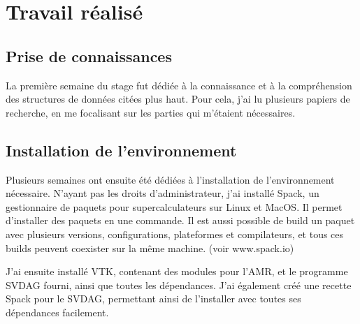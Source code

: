 \documentclass[12pt,a4paper,twoside]{article}
\begin{document}
    \begin{figure}[H]
    \end{figure}

    \begin{figure}[H]
    \end{figure}

    \section{Travail réalisé}

    \subsection{Prise de connaissances}

    La première semaine du stage fut dédiée à la connaissance et à la compréhension des structures de données citées plus haut.
    Pour cela, j'ai lu plusieurs papiers de recherche, en me focalisant sur les parties qui m'étaient nécessaires.

    \subsection{Installation de l'environnement}

    Plusieurs semaines ont ensuite été dédiées à l'installation de l'environnement nécessaire.
    N'ayant pas les droits d'administrateur, j'ai installé Spack, un gestionnaire de paquets pour supercalculateurs sur Linux et MacOS.
    Il permet d'installer des paquets en une commande. Il est aussi possible de build un paquet avec plusieurs versions, configurations,
    plateformes et compilateurs, et tous ces builds peuvent coexister sur la même machine. (voir www.spack.io)


    J'ai ensuite installé VTK, contenant des modules pour l'AMR, et le programme SVDAG fourni, ainsi que toutes les dépendances. J'ai également
    créé une recette Spack pour le SVDAG, permettant ainsi de l'installer avec toutes ses dépendances facilement.
\end{document}

